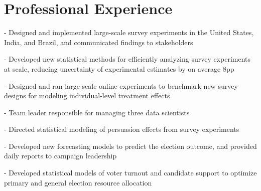 \documentclass[]{deedy-resume-openfont}
\begin{document}
\begin{minipage}[t]{0.66\textwidth} 


\section{Professional Experience}

\vspace{\topsep} %
\begin{tightemize}
\item[-] Designed and implemented large-scale survey experiments in the United States, India, and Brazil, and communicated findings to stakeholders
\item[-] Developed new statistical methods for efficiently analyzing survey experiments at scale, reducing uncertainty of experimental estimates by on average 8pp
\item[-] Designed and ran large-scale online experiments to benchmark new survey designs for modeling individual-level treatment effects
\end{tightemize}
\sectionsep

\begin{tightemize}
\item[-] Team leader responsible for managing three data scientists
\item[-] Directed statistical modeling of persuasion effects from survey experiments
\item[-] Developed new forecasting models to predict the election outcome, and provided daily reports to campaign leadership
\item[-] Developed statistical models of voter turnout and candidate support to optimize primary and general election resource allocation
\end{tightemize}



\end{minipage}
\end{document}
